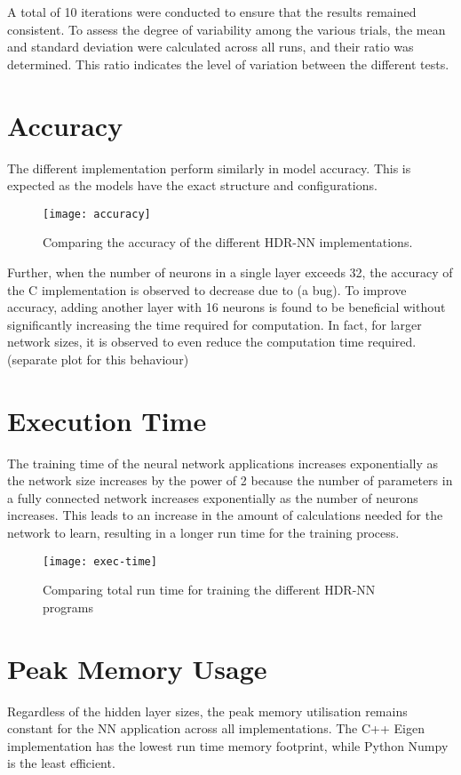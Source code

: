 A total of 10 iterations were conducted to ensure that the results remained consistent. To assess the degree of variability among the various trials, the mean and standard deviation were calculated across all runs, and their ratio was determined. This ratio indicates the level of variation between the different tests.

\section{Accuracy}
The different implementation perform similarly in model accuracy. This is expected as the models have the exact structure and configurations.
\begin{figure}[ht]
	\centering
	\texttt{[image: accuracy]}
	\caption[HDR-NN Accuracy]{Comparing the accuracy of the different HDR-NN implementations.}
\end{figure}

Further, when the number of neurons in a single layer exceeds 32, the accuracy of the C implementation is observed to decrease due to (a bug). To improve accuracy, adding another layer with 16 neurons is found to be beneficial without significantly increasing the time required for computation. In fact, for larger network sizes, it is observed to even reduce the computation time required. (separate plot for this behaviour)

\section{Execution Time}
The training time of the neural network applications increases exponentially as the network size increases by the power of 2 because the number of parameters in a fully connected network increases exponentially as the number of neurons increases. This leads to an increase in the amount of calculations needed for the network to learn, resulting in a longer run time for the training process.

\begin{figure}[ht]
	\centering
	\texttt{[image: exec-time]}
	\caption[Execution Time vs Model Parameters]{Comparing total run time for training the different HDR-NN programs}
\end{figure}


\section{Peak Memory Usage}
Regardless of the hidden layer sizes, the peak memory utilisation remains constant for the NN application across all implementations. The C++ Eigen implementation has the lowest run time memory footprint, while Python Numpy is the least efficient.

